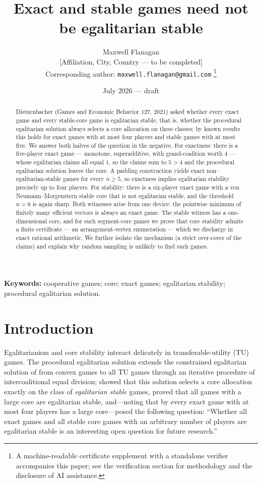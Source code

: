 \documentclass[11pt]{article}
\title{Exact and stable games need not be egalitarian stable}
\author{Maxwell Flanagan\\[2pt]
\normalsize [Affiliation, City, Country --- to be completed]\\
\normalsize Corresponding author: \texttt{maxwell.flanagan@gmail.com}%
\thanks{A machine-readable certificate supplement with a standalone verifier
accompanies this paper; see the verification section for methodology and the
disclosure of AI assistance.}}
\date{July 2026 --- draft}
\begin{document}
\maketitle

\begin{abstract}
Dietzenbacher (Games and Economic Behavior 127, 2021) asked whether every
exact game and every stable-core game is egalitarian stable, that is, whether
the procedural egalitarian solution always selects a core allocation on these
classes; by known results this holds for exact games with at most four players
and stable games with at most five. We answer both halves of the question in
the negative. For exactness: there is a five-player exact game --- monotone,
superadditive, with grand-coalition worth $4$ --- whose egalitarian claims all
equal $1$, so the claims sum to $5>4$ and the procedural egalitarian solution
leaves the core. A padding construction yields exact non--egalitarian-stable
games for every $n\ge5$, so exactness implies egalitarian stability precisely
up to four players. For stability: there is a six-player exact game with a von
Neumann--Morgenstern stable core that is not egalitarian stable, and the
threshold $n=6$ is again sharp. Both witnesses arise from one device: the
pointwise minimum of finitely many efficient vectors is always an exact game.
The stable witness has a one-dimensional core, and for such segment-core games
we prove that core stability admits a finite certificate --- an arrangement-vertex
enumeration --- which we discharge in exact rational arithmetic. We further
isolate the mechanism (a strict over-cover of the claims) and explain why
random sampling is unlikely to find such games.
\end{abstract}

\medskip
\noindent\textbf{Keywords:} cooperative games; core; exact games;
egalitarian stability; procedural egalitarian solution.

\section{Introduction}\label{sec:intro}

Egalitarianism and core stability interact delicately in
transferable-utility (TU) games. The procedural egalitarian solution
\citep{DBH2017} extends the constrained egalitarian solution of
\citet{DuttaRay89} from convex games to all TU games through an iterative
procedure of intercoalitional equal division; \citet{Dietzenbacher2021}
showed that this solution selects a core allocation exactly on the class of
\emph{egalitarian stable} games, proved that all games with a large core
\citep{Sharkey1982} are egalitarian stable, and---noting that by
\citet{Biswas1999} every exact game \citep{Schmeidler1972} with at most four
players has a large core---posed the following question: ``Whether all exact
games and all stable core games with an arbitrary number of players are
egalitarian stable is an interesting open question for future research.''
\end{document}
